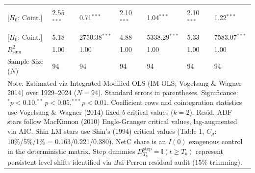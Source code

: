 \begin{table}[H]
\begin{tabular}{p{3.8cm}p{2.1cm}p{2.1cm}p{2.1cm}p{2.1cm}p{2.1cm}p{2.1cm}}
\makecell[l]{Shin LM ($C_{\text{Shin}}$) \\ {\scriptsize [$H_0$: Coint.]}} & 2.55$^{***}$ & 0.71$^{***}$ & 2.10$^{***}$ & 1.04$^{***}$ & 2.10$^{***}$ & 1.22$^{***}$  \\
\makecell[l]{VW Type 2 ($S_{\text{Type 2}}$) \\ {\scriptsize [$H_0$: Coint.]}} & 5.18 & 2750.38$^{***}$ & 4.88 & 5338.29$^{***}$ & 5.33 & 7583.07$^{***}$  \\
\midrule
$R^2_{\text{sum}}$ & 1.00 & 1.00 & 1.00 & 1.00 & 1.00 & 1.00  \\
Sample Size ($N$) & 94 & 94 & 94 & 94 & 94 & 94  \\
\bottomrule
\multicolumn{7}{p{16.5cm}}{\footnotesize Note: Estimated via Integrated Modified OLS (IM-OLS; Vogelsang \& Wagner 2014) over 1929--2024 ($N=94$). Standard errors in parentheses. Significance: $^*p<0.10, ^{**}p<0.05, ^{***}p<0.01$. Coefficient rows and cointegration statistics use Vogelsang \& Wagner (2014) fixed-$b$ critical values ($k=2$). Resid. ADF stars follow MacKinnon (2010) Engle-Granger critical values, lag-augmented via AIC. Shin LM stars use Shin's (1994) critical values (Table 1, $C_\mu$: 10\%/5\%/1\% = 0.163/0.221/0.380). NetC share is an $I(0)$ exogenous control in the deterministic matrix. Step dummies $D^{\text{step}}_{T_b} = \mathbb{I}(t \ge T_b)$ represent persistent level shifts identified via Bai-Perron residual audit (15\% trimming).}
\end{tabular}
\end{table}
